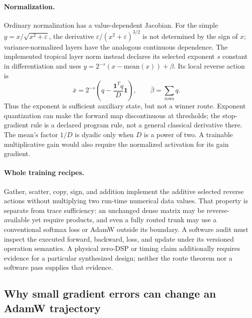 \paragraph{Normalization.}
Ordinary normalization has a value-dependent Jacobian. For the simple
$y=x/\sqrt{x^2+\varepsilon}$, the derivative
$\varepsilon/(x^2+\varepsilon)^{3/2}$ is not determined by the sign of $x$;
variance-normalized layers have the analogous continuous dependence.
The implemented tropical layer norm instead declares its selected exponent
$s$ constant in differentiation and uses
$y=2^{-s}(x-\mathrm{mean}(x))+\beta$. Its local reverse action is
\begin{equation}
 \bar x=2^{-s}\left(q-\frac{\mathbf{1}^Tq}{D}\mathbf{1}\right),
 \qquad \bar\beta=\sum_{\text{rows}}q.
\end{equation}
Thus the exponent is sufficient auxiliary state, but not a winner route.
Exponent quantization can make the forward map discontinuous at thresholds;
the stop-gradient rule is a declared program rule, not a general classical
derivative there. The mean's factor $1/D$ is dyadic only when $D$ is a power
of two. A trainable multiplicative gain would also require the normalized
activation for its gain gradient.

\paragraph{Whole training recipes.}
Gather, scatter, copy, sign, and addition implement the additive selected
reverse actions without multiplying two run-time numerical data values.
That property is separate from trace sufficiency: an unchanged dense matrix
may be reverse-available yet require products, and even a fully routed trunk
may use a conventional softmax loss or AdamW outside its boundary. A software
audit must inspect the executed forward, backward, loss, and update under
its versioned operation semantics. A physical zero-DSP or timing claim
additionally requires evidence for a particular synthesized design; neither
the route theorem nor a software pass supplies that evidence.

\subsection{Why small gradient errors can change an AdamW trajectory}
\label{app:adamw-sensitivity}

